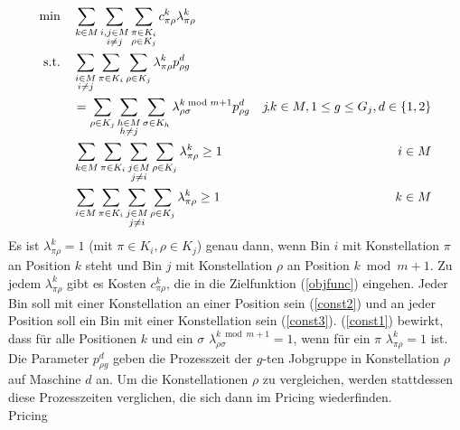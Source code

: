 \documentclass{article}
\begin{document}
\begin{align}
    \text{min}\quad &\sum_{k\in M}\sum_{\substack{i,j\in M \\ i\neq j}}\sum_{\substack{\pi\in K_i \\ \rho\in K_j}} c_{\pi\rho}^k \lambda_{\pi\rho}^k \label{objfunc} \\
    \text{s.t.} \quad &\sum_{\substack{i\in M \\ i\neq j}}\sum_{\pi\in K_i}\sum_{\rho\in K_j} \lambda_{\pi\rho}^k p_{\rho g}^d \notag \\
    &= \sum_{\rho\in K_j}\sum_{\substack{h\in M \\ h\neq j}}\sum_{\sigma\in K_h} \lambda_{\rho\sigma}^{k\bmod m+1} p_{\rho g}^d 
    & j\!,\!k\in{M}, 1\leq g\leq G_j, d\in\{1,2\} \label{const1} \\
    &\sum_{k\in M}\sum_{\pi\in K_i}\sum_{\substack{j\in M \\ j\neq i}}\sum_{\rho\in K_j} \lambda_{\pi\rho}^k \geq 1 & i\in M \label{const2} \\
    &\sum_{i\in M}\sum_{\pi\in K_i}\sum_{\substack{j\in M \\ j\neq i}}\sum_{\rho\in K_j} \lambda_{\pi\rho}^k \geq 1 & k\in M \label{const3}
\end{align}%
Es ist $\lambda_{\pi\rho}^k = 1$ (mit $\pi\in K_i,\rho\in K_j$) genau dann, wenn Bin $i$ mit Konstellation $\pi$ an Position $k$ steht und
Bin $j$ mit Konstellation $\rho$ an Position $k\bmod m+1$.
Zu jedem $\lambda_{\pi\rho}^k$ gibt es Kosten $c_{\pi\rho}^k$, die in die Zielfunktion (\ref{objfunc}) eingehen.
Jeder Bin soll mit einer Konstellation an einer Position sein (\ref{const2}) und an jeder Position soll ein Bin mit einer Konstellation sein (\ref{const3}).
(\ref{const1}) bewirkt, dass für alle Positionen $k$ und ein $\sigma$ $\lambda_{\rho\sigma}^{k\bmod m+1} = 1$, wenn für ein $\pi$ $\lambda_{\pi\rho}^k = 1$ ist.
Die Parameter $p_{\rho g}^d$ geben die Prozesszeit der $g$-ten Jobgruppe in Konstellation $\rho$ auf Maschine $d$ an.
Um die Konstellationen $\rho$ zu vergleichen, werden stattdessen diese Prozesszeiten verglichen, die sich dann im Pricing wiederfinden.
%
\\
Pricing\\
\\
\end{document}
